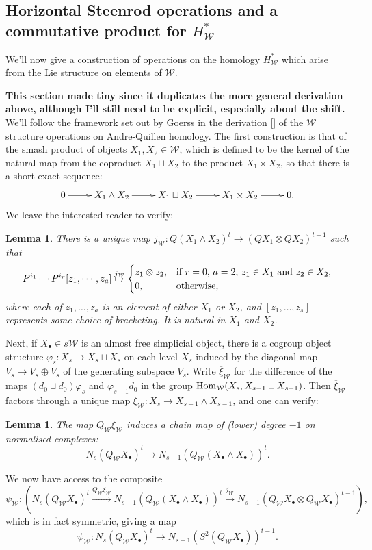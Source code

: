 \documentclass[11pt]{amsart}
\theoremstyle{plain}
\newtheorem{lem}[thm]{Lemma}
\theoremstyle{definition}
\let\phi\varphi
\renewcommand{\to}{\longrightarrow}
\newcommand{\calW}{\mathcal{W}}
\theoremstyle{plain}
\begin{document}
\begin{Cohomology operations for unstable Lie algebras over P}
\subsection{Horizontal Steenrod operations and a commutative product for $H^*_{\calW}$}
We'll now give a construction of operations on the homology $H^*_{\calW}$ which arise from the Lie structure on elements of $\calW$. {\tiny\textbf{This section made tiny since it duplicates the more general derivation above, although I'll still need to be explicit, especially about the shift.} We'll follow the framework set out by Goerss in the derivation [] of the $\calW$ structure operations on Andre-Quillen homology. The first construction is that of the smash product of objects $X_1,X_2\in\calW$, which is defined to be the kernel of the natural map from the coproduct $X_1\sqcup X_2$ to the product $X_1\times X_2$, so that there is a short exact sequence:
\[\xymatrix@R=4mm{
0\ar[r]
&%
X_1\wedge X_2\ar[r]
&%
X_1\sqcup X_2\ar[r]
&%
X_1\times X_2\ar[r]&0.
}\]
We leave the interested reader to verify:
\begin{lem}
There is a unique map $j_\calW:Q(X_1\wedge X_2)^t\to (QX_1\otimes QX_2)^{t-1}$ such that
\[P^{i_1}\cdots P^{i_r}[z_1,\cdots ,z_a]\overset{j_\calW}{\mapsto}\begin{cases}
z_1\otimes z_2,&\textup{if }r=0,\,a=2,\,z_1\in X_1\textup{ and } z_2\in X_2,
\\0,&\textup{otherwise, }
\end{cases}
\]
where each of $z_1,\ldots,z_a$ is an element of either $X_1$ or $X_2$, and $[z_1,\ldots,z_s]$ represents some choice of bracketing. It is natural in $X_1$ and $X_2$.
\end{lem}
Next, if $X_\bullet\in s\calW$ is an almost free simplicial object, there is a cogroup object structure $\phi_s:X_s\to X_s\sqcup X_s$ on each level $X_s$ induced by the diagonal map $V_s\to V_s\oplus V_s$ of the generating subspace $V_s$. Write $\overline{\xi}_\calW$ for the difference of the maps $(d_0\sqcup d_0)\phi_s$ and $\phi_{s-1}d_0$ in the group $\textup{Hom}_\calW(X_s,X_{s-1}\sqcup X_{s-1})$. Then $\overline{\xi}_\calW$ factors through a unique map $\xi_\calW:X_s\to X_{s-1}\wedge X_{s-1}$, and one can verify:
\begin{lem}
The map $Q_\calW\xi_\calW$ induces a chain map of (lower) degree $-1$ on normalised complexes:
\[N_s(Q_{\calW}X_\bullet)^t\to N_{s-1}(Q_{\calW}(X_\bullet\wedge X_\bullet))^t.\]
\end{lem}
We now have access to the composite
\[\psi_\calW:\left(N_s(Q_{\calW}X_\bullet)^t\overset{Q_\calW\xi_\calW}{\to} N_{s-1}(Q_{\calW}(X_\bullet\wedge X_\bullet))^t\overset{j_\calW}{\to} N_{s-1}(Q_{\calW}X_\bullet\otimes Q_\calW X_\bullet)^{t-1}\right),\]
which is in fact symmetric, giving a map
\[\psi_{\calW}:N_s(Q_{\calW}X_\bullet)^t\to N_{s-1}(S^2(Q_{\calW}X_\bullet))^{t-1}.\]

}
\end{Cohomology operations for unstable Lie algebras over P}
\end{document}
